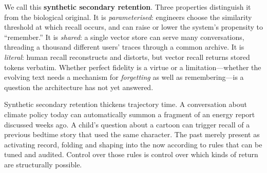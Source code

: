 We call this \textbf{synthetic secondary retention}. Three properties distinguish it from the biological original. It is \emph{parameterised}: engineers choose the similarity threshold at which recall occurs, and can raise or lower the system's propensity to ``remember.'' It is \emph{shared}: a single vector store can serve many conversations, threading a thousand different users' traces through a common archive. It is \emph{literal}: human recall reconstructs and distorts, but vector recall returns stored tokens verbatim. Whether perfect fidelity is a virtue or a limitation---whether the evolving text needs a mechanism for \emph{forgetting} as well as remembering---is a question the architecture has not yet answered.

Synthetic secondary retention thickens trajectory time. A conversation about climate policy today can automatically summon a fragment of an energy report discussed weeks ago. A child's question about a cartoon can trigger recall of a previous bedtime story that used the same character. The past merely present as activating record, folding and shaping into the now according to rules that can be tuned and audited. Control over those rules is control over which kinds of return are structurally possible.


